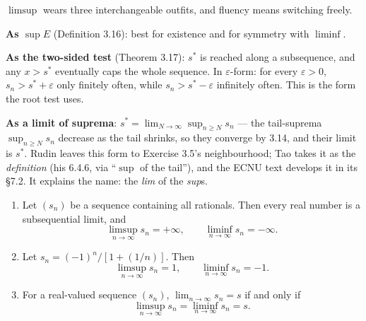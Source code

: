 \begin{unpack}
$\limsup$ wears three interchangeable outfits, and fluency means switching
freely.

\smallskip
\textbf{As $\sup E$} (Definition 3.16): best for existence and for symmetry
with $\liminf$.

\smallskip
\textbf{As the two-sided test} (Theorem 3.17): $s^*$ is reached along a
subsequence, and any $x > s^*$ eventually caps the whole sequence. In
$\varepsilon$-form: for every $\varepsilon > 0$, $s_n > s^*+\varepsilon$ only
finitely often, while $s_n > s^*-\varepsilon$ infinitely often. This is the
form the root test uses.

\smallskip
\textbf{As a limit of suprema}: $s^* = \lim_{N\to\infty} \sup_{n\ge N} s_n$
--- the tail-suprema $\sup_{n \ge N} s_n$ decrease as the tail shrinks, so
they converge by 3.14, and their limit is $s^*$. Rudin leaves this form to
Exercise 3.5's neighbourhood; Tao takes it as the \emph{definition} (his
6.4.6, via ``$\sup$ of the tail''), and the ECNU text develops it in its
\S7.2. It explains the name: the \emph{lim} of the \emph{sup}s.
\end{unpack}

\begin{enumerate}[label=(\alph*), leftmargin=2.2em, itemsep=3pt, topsep=4pt]
  \item Let $(s_n)$ be a sequence containing all rationals. Then every real
        number is a subsequential limit, and
        \[ \limsup_{n\to\infty} s_n = +\infty, \qquad
           \liminf_{n\to\infty} s_n = -\infty. \]
  \item Let $s_n = (-1)^n/[1+(1/n)]$. Then
        \[ \limsup_{n\to\infty} s_n = 1, \qquad
           \liminf_{n\to\infty} s_n = -1. \]
  \item For a real-valued sequence $(s_n)$, $\lim_{n\to\infty} s_n = s$ if and
        only if
        \[ \limsup_{n\to\infty} s_n = \liminf_{n\to\infty} s_n = s. \]
\end{enumerate}

